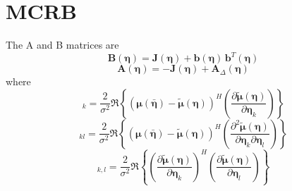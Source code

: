 \documentclass[11pt]{article}
\newcommand{\bmmu}{\bm{\mu}}
\newcommand{\bmtildemu}{\bm{\tilde{\mu}}}
\newcommand{\bmeta}{\bm{\eta}}
\newcommand{\bmetabar}{\bm{\bar{\eta}}}
\begin{document}
\section*{MCRB}

The A and B matrices are
\begin{equation}
  \bm{B}(\bm{\eta}) = \bm{J}(\bm{\eta}) + \bm{b}(\bm{\eta})\,\bm{b}^T(\bm{\eta})
\end{equation}
\begin{equation}
  \bm{A}(\bm{\eta})
  = -\bm{J}(\bm{\eta})
    + \bm{A}_\Delta(\bm{\eta})
\end{equation}
where
\begin{equation}
    [\bm{b}(\bmeta)]_{k} = \frac{2}{\sigma^2}\Re\left\{(\bmmu(\bmetabar)-\bmtildemu(\bmeta))^H\left(\frac{\partial\bmtildemu (\bmeta)}{\partial \bmeta_k}\right)\right\}
\end{equation}
\begin{equation}
  [\bm{A}_\Delta(\bm{\eta})]_{kl}
  = \frac{2}{\sigma^2}
    \Re\left\{(\bmmu(\bmetabar)-\bmtildemu(\bmeta))^H\left(\frac{\partial^2\bmtildemu (\bmeta)}{\partial \bmeta_k\partial \bmeta_l}\right)\right\}
\end{equation}
\begin{equation}
  [\bm{J}(\bm{\eta})]_{k,l}
  = \frac{2}{\sigma^2}
    \Re\left\{
    \left(\frac{\partial\bmtildemu (\bmeta)}{\partial \bmeta_k}\right)^H  
    \left(\frac{\partial\bmtildemu (\bmeta)}{\partial \bmeta_l}\right)
    \right\}
  \label{eq:J-classical}
\end{equation}
\end{document}
